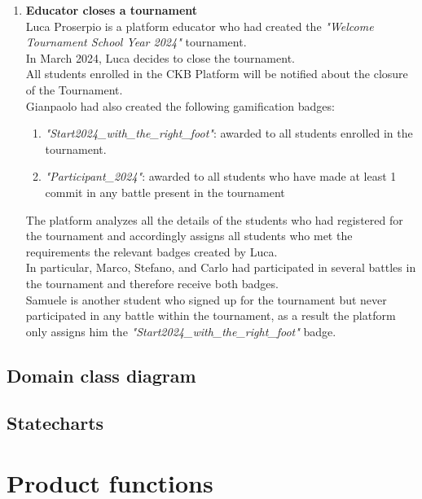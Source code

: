 \begin{enumerate}
	\item \textbf{Educator closes a tournament}\\
	      Luca Proserpio is a platform educator who had created the \emph{"Welcome Tournament School Year 2024"} tournament.\\
	      In March 2024, Luca decides to close the tournament.\\
	      All students enrolled in the CKB Platform will be notified about the closure of the Tournament.\\
	      Gianpaolo had also created the following gamification badges:
	      \begin{enumerate}
		      \item \emph{"Start2024_with_the_right_foot"}: awarded to all students enrolled in the tournament.
		      \item \emph{"Participant_2024"}: awarded to all students who have made at least 1 commit in any battle present in the tournament
	      \end{enumerate}
	      The platform analyzes all the details of the students who had registered for the tournament and accordingly assigns all students who met the requirements the relevant badges created by Luca.\\
	      In particular, Marco, Stefano, and Carlo had participated in several battles in the tournament and therefore receive both badges.\\
	      Samuele is another student who signed up for the tournament but never participated in any battle within the tournament, as a result the platform only assigns him the \emph{"Start2024_with_the_right_foot"} badge.

\end{enumerate}


\subsection{Domain class diagram}

\subsection{Statecharts}




\section{Product functions}




